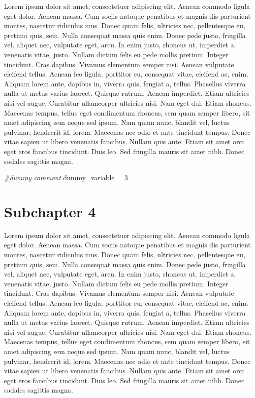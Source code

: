 \documentclass[]{book}
\newenvironment{Shaded}{\begin{snugshade}}{\end{snugshade}}
\newcommand{\DecValTok}[1]{\textcolor[rgb]{0.00,0.00,0.81}{#1}}
\newcommand{\StringTok}[1]{\textcolor[rgb]{0.31,0.60,0.02}{#1}}
\newcommand{\CommentTok}[1]{\textcolor[rgb]{0.56,0.35,0.01}{\textit{#1}}}
\newcommand{\NormalTok}[1]{#1}
\begin{document}
Lorem ipsum dolor sit amet, consectetuer adipiscing elit. Aenean commodo
ligula eget dolor. Aenean massa. Cum sociis natoque penatibus et magnis
dis parturient montes, nascetur ridiculus mus. Donec quam felis,
ultricies nec, pellentesque eu, pretium quis, sem. Nulla consequat massa
quis enim. Donec pede justo, fringilla vel, aliquet nec, vulputate eget,
arcu. In enim justo, rhoncus ut, imperdiet a, venenatis vitae, justo.
Nullam dictum felis eu pede mollis pretium. Integer tincidunt. Cras
dapibus. Vivamus elementum semper nisi. Aenean vulputate eleifend
tellus. Aenean leo ligula, porttitor eu, consequat vitae, eleifend ac,
enim. Aliquam lorem ante, dapibus in, viverra quis, feugiat a, tellus.
Phasellus viverra nulla ut metus varius laoreet. Quisque rutrum. Aenean
imperdiet. Etiam ultricies nisi vel augue. Curabitur ullamcorper
ultricies nisi. Nam eget dui. Etiam rhoncus. Maecenas tempus, tellus
eget condimentum rhoncus, sem quam semper libero, sit amet adipiscing
sem neque sed ipsum. Nam quam nunc, blandit vel, luctus pulvinar,
hendrerit id, lorem. Maecenas nec odio et ante tincidunt tempus. Donec
vitae sapien ut libero venenatis faucibus. Nullam quis ante. Etiam sit
amet orci eget eros faucibus tincidunt. Duis leo. Sed fringilla mauris
sit amet nibh. Donec sodales sagittis magna.

\begin{Shaded}
\begin{Highlighting}[]
\CommentTok{#dummy comment}
\NormalTok{dummy_variable =}\StringTok{ }\DecValTok{3}
\end{Highlighting}
\end{Shaded}

\section{Subchapter 4}\label{subchapter-4}

Lorem ipsum dolor sit amet, consectetuer adipiscing elit. Aenean commodo
ligula eget dolor. Aenean massa. Cum sociis natoque penatibus et magnis
dis parturient montes, nascetur ridiculus mus. Donec quam felis,
ultricies nec, pellentesque eu, pretium quis, sem. Nulla consequat massa
quis enim. Donec pede justo, fringilla vel, aliquet nec, vulputate eget,
arcu. In enim justo, rhoncus ut, imperdiet a, venenatis vitae, justo.
Nullam dictum felis eu pede mollis pretium. Integer tincidunt. Cras
dapibus. Vivamus elementum semper nisi. Aenean vulputate eleifend
tellus. Aenean leo ligula, porttitor eu, consequat vitae, eleifend ac,
enim. Aliquam lorem ante, dapibus in, viverra quis, feugiat a, tellus.
Phasellus viverra nulla ut metus varius laoreet. Quisque rutrum. Aenean
imperdiet. Etiam ultricies nisi vel augue. Curabitur ullamcorper
ultricies nisi. Nam eget dui. Etiam rhoncus. Maecenas tempus, tellus
eget condimentum rhoncus, sem quam semper libero, sit amet adipiscing
sem neque sed ipsum. Nam quam nunc, blandit vel, luctus pulvinar,
hendrerit id, lorem. Maecenas nec odio et ante tincidunt tempus. Donec
vitae sapien ut libero venenatis faucibus. Nullam quis ante. Etiam sit
amet orci eget eros faucibus tincidunt. Duis leo. Sed fringilla mauris
sit amet nibh. Donec sodales sagittis magna.
\end{document}
